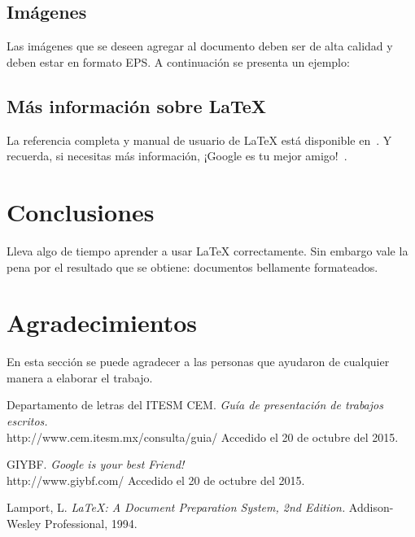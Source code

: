 \documentclass[10pt,letterpaper,oneside]{article}
\begin{document}
\subsection{Imágenes}

Las imágenes que se deseen agregar al documento deben ser de alta calidad y deben estar en formato EPS. A continuación se presenta un ejemplo: 

\centerline{}
   
\subsection{Más información sobre \LaTeX}

La referencia completa y manual de usuario de {\LaTeX} está disponible en~\cite{lamport}. Y recuerda, si necesitas más información, ¡Google es tu mejor amigo!~\cite{giybf}.

\section{Conclusiones}

Lleva algo de tiempo aprender a usar {\LaTeX} correctamente. Sin embargo vale la pena por el resultado que se obtiene: documentos bellamente formateados. 

\section{Agradecimientos}

En esta sección se puede agradecer a las personas que ayudaron de cualquier manera a elaborar el trabajo. 

\theendnotes
 
\begin{thebibliography}{9}
    
    Departamento de letras del ITESM CEM. 
    \emph{Guía de presentación de trabajos escritos.} \\
    http://www.cem.itesm.mx/consulta/guia/ Accedido el 20 de octubre del 2015.
    
    GIYBF. 
    \emph{Google is your best Friend!} \\
    http://www.giybf.com/ Accedido el 20 de octubre del 2015.
    
    Lamport, L. 
    \emph{\LaTeX: A Document Preparation System, 2nd Edition.} 
    Addison-Wesley Professional, 1994.

\end{thebibliography}
\end{document}
